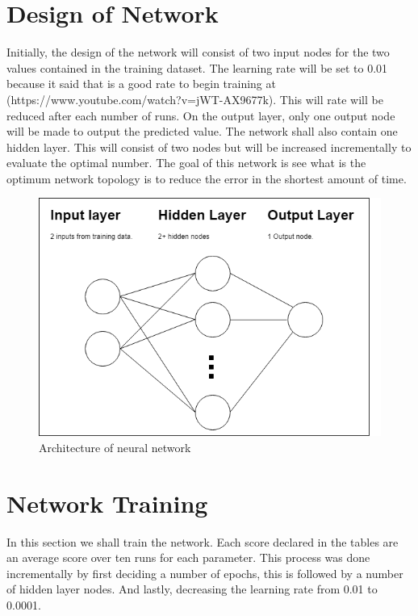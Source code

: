 
\section*{Design of Network}
Initially, the design of the network will consist of two input nodes for the two values contained in the training dataset. The learning rate will be set to 0.01 because it said that is a good rate to begin training at (https://www.youtube.com/watch?v=jWT-AX9677k). This will rate will be reduced after each number of runs. On the output layer, only one output node will be made to output the predicted value.
The network shall also contain one hidden layer. This will consist of two nodes but will be increased incrementally to evaluate the optimal number.
The goal of this network is see what is the optimum network topology is to reduce the error in the shortest amount of time. 

\begin{figure}[ht]
	\begin{center}
		\advance\leftskip-3cm
		\advance\rightskip-3cm
		\includegraphics[keepaspectratio=true,scale=0.6]{__resources/networkarch.png}
		\caption{Architecture of neural network}
		\label{member2}
	\end{center}
\end{figure}

\newpage
\section*{Network Training}
In this section we shall train the network. Each score declared in the tables are an average score over ten runs for each parameter. This process was done incrementally by first deciding a number of epochs, this is followed by a number of hidden layer nodes. And lastly, decreasing the learning rate from 0.01 to 0.0001.

